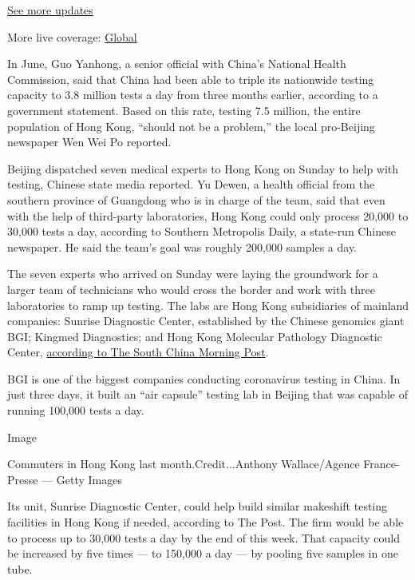 \href{https://www.nytimes.com/live/2020/08/07/business/stock-market-today-coronavirus?action=click\&pgtype=Article\&state=default\&region=MAIN_CONTENT_1\&context=storylines_live_updates}{See
more updates}

More live coverage:
\href{https://www.nytimes.com/2020/08/07/world/covid-19-news.html?action=click\&pgtype=Article\&state=default\&region=MAIN_CONTENT_1\&context=storylines_live_updates}{Global}

In June, Guo Yanhong, a senior official with China's National Health
Commission, said that China had been able to triple its nationwide
testing capacity to 3.8 million tests a day from three months earlier,
according to a government statement. Based on this rate, testing 7.5
million, the entire population of Hong Kong, ``should not be a
problem,'' the local pro-Beijing newspaper Wen Wei Po reported.

Beijing dispatched seven medical experts to Hong Kong on Sunday to help
with testing, Chinese state media reported. Yu Dewen, a health official
from the southern province of Guangdong who is in charge of the team,
said that even with the help of third-party laboratories, Hong Kong
could only process 20,000 to 30,000 tests a day, according to Southern
Metropolis Daily, a state-run Chinese newspaper. He said the team's goal
was roughly 200,000 samples a day.

The seven experts who arrived on Sunday were laying the groundwork for a
larger team of technicians who would cross the border and work with
three laboratories to ramp up testing. The labs are Hong Kong
subsidiaries of mainland companies: Sunrise Diagnostic Center,
established by the Chinese genomics giant BGI; Kingmed Diagnostics; and
Hong Kong Molecular Pathology Diagnostic Center,
\href{https://www.scmp.com/news/hong-kong/health-environment/article/3096037/hong-kong-third-wave-three-labs-picked-help}{according
to The South China Morning Post}.

BGI is one of the biggest companies conducting coronavirus testing in
China. In just three days, it built an ``air capsule'' testing lab in
Beijing that was capable of running 100,000 tests a day.

Image

Commuters in Hong Kong last month.Credit...Anthony Wallace/Agence
France-Presse --- Getty Images

Its unit, Sunrise Diagnostic Center, could help build similar makeshift
testing facilities in Hong Kong if needed, according to The Post. The
firm would be able to process up to 30,000 tests a day by the end of
this week. That capacity could be increased by five times --- to 150,000
a day --- by pooling five samples in one tube.


